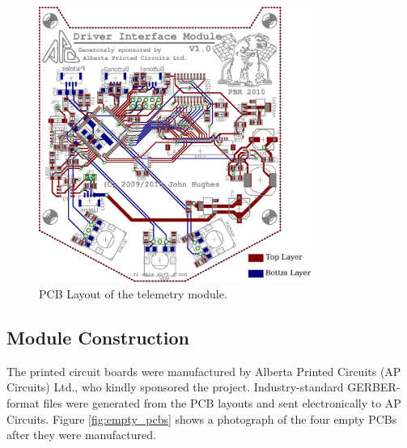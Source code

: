 \begin{figure}[h]
  \centering
  \includegraphics[width=3.5in,keepaspectratio]{implementation/figures/driver_interface_layout.eps}
  \caption{PCB Layout of the telemetry module.}
  \label{fig:driver_interface_layout}
\end{figure}

\subsection{Module Construction}

The printed circuit boards were manufactured by Alberta Printed Circuits (AP Circuits) Ltd., who kindly sponsored the project. Industry-standard GERBER-format files were generated from the PCB layouts and sent electronically to AP Circuits. Figure \ref{fig:empty_pcbs} shows a photograph of the four empty PCBs after they were manufactured.

